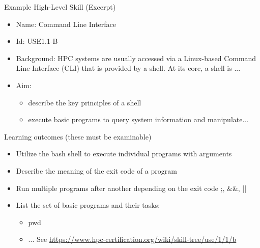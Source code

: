 \documentclass[compress,aspectratio=169]{beamer}
\begin{document}
\begin{frame}{Example High-Level Skill (Excerpt)}
\begin{itemize}
\item Name: Command Line Interface
\item Id: USE1.1-B
\item Background: {\small HPC systems are usually accessed via a Linux-based Command Line Interface (CLI) that is provided by a shell.
At its core, a shell is ...}
\item Aim:
\begin{itemize}
\item describe the key principles of a shell
\item execute basic programs to query system information and manipulate...
\end{itemize}
\end{itemize}

\begin{block}{Learning outcomes (these must be examinable)}
\begin{itemize}
\item Utilize the bash shell to execute individual programs with arguments
\item Describe the meaning of the exit code of a program
\item Run multiple programs after another depending on the exit code ;, \&\&, ||
\item List the set of basic programs and their tasks:
\begin{itemize}
  \item pwd
  \item ... See \url{https://www.hpc-certification.org/wiki/skill-tree/use/1/1/b}
\end{itemize}
\end{itemize}
\end{block}
\end{frame}
\end{document}
